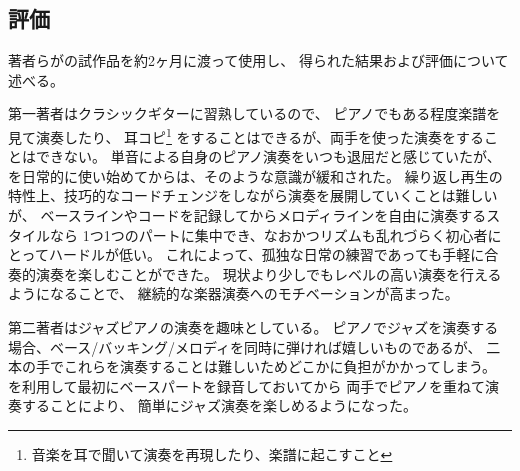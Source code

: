\subsection{評価}

著者らが{\system}の試作品を約2ヶ月に渡って使用し、
得られた結果および評価について述べる。

第一著者はクラシックギターに習熟しているので、
ピアノでもある程度楽譜を見て演奏したり、
耳コピ\footnote{\textsf{音楽を耳で聞いて演奏を再現したり、楽譜に起こすこと}}
をすることはできるが、両手を使った演奏をすることはできない。
単音による自身のピアノ演奏をいつも退屈だと感じていたが、
{\system}を日常的に使い始めてからは、そのような意識が緩和された。
繰り返し再生の特性上、技巧的なコードチェンジをしながら演奏を展開していくことは難しいが、
ベースラインやコードを記録してからメロディラインを自由に演奏するスタイルなら
1つ1つのパートに集中でき、なおかつリズムも乱れづらく初心者にとってハードルが低い。
これによって、孤独な日常の練習であっても手軽に合奏的演奏を楽しむことができた。
現状より少しでもレベルの高い演奏を行えるようになることで、
継続的な楽器演奏へのモチベーションが高まった。

第二著者はジャズピアノの演奏を趣味としている。
ピアノでジャズを演奏する場合、ベース/バッキング/メロディを同時に弾ければ嬉しいものであるが、
二本の手でこれらを演奏することは難しいためどこかに負担がかかってしまう。
{\system}を利用して最初にベースパートを録音しておいてから
両手でピアノを重ねて演奏することにより、
簡単にジャズ演奏を楽しめるようになった。
